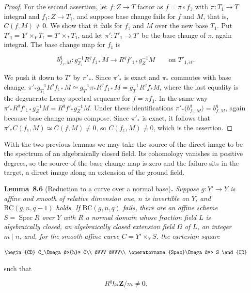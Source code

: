 \documentclass[11pt]{article}
\newenvironment{bpstatement}[2]{\par\addvspace{0.6\baselineskip}\noindent\textbf{#1}#2\textbf{.}\enspace\ignorespaces}
  {\par\addvspace{0.4\baselineskip}}
\newenvironment{bpstatementit}[2]{\begin{bpstatement}{#1}{#2}\itshape\ignorespaces}{\end{bpstatement}}
\begin{document}
\begin{proof}[{Proof}]
For the second assertion, let \(f:Z\to T\) factor as \(f=\pi\circ f_1\) with \(\pi:T_1\to T\) integral and \(f_1:Z\to T_1\), and suppose base change fails for \(f\) and \(M\), that is, \(C(f,M)\neq0\). We show that it fails for \(f_1\) and \(M\) over the new base \(T_1\). Put \(T'_1=Y'\times_YT_1=T'\times_TT_1\), and let \(\pi':T'_1\to T'\) be the base change of \(\pi\), again integral. The base change map for \(f_1\) is

\[
b^q_{f_1,M}:g_{T_1}^{-1}R^qf_{1*}M\longrightarrow R^qf'_{1*}g_Z^{-1}M
\qquad\text{on }T'_{1,\acute{e}t}.
\]

We push it down to \(T'\) by \(\pi'_*\). Since \(\pi'_*\) is exact and \(\pi_*\) commutes with base change, \(\pi'_*g_{T_1}^{-1}R^qf_{1*}M\simeq g_T^{-1}\pi_*R^qf_{1*}M
=g_T^{-1}R^qf_*M\), where the last equality is the degenerate Leray spectral sequence for \(f=\pi f_1\). In the same way \(\pi'_*R^qf'_{1*}g_Z^{-1}M=R^qf'_*g_Z^{-1}M\). Under these identifications \(\pi'_*\bigl(b^q_{f_1,M}\bigr)=b^q_{f,M}\), again because base change maps compose. Since \(\pi'_*\) is exact, it follows that \(\pi'_*C(f_1,M)\simeq C(f,M)\neq0\), so \(C(f_1,M)\neq0\), which is the assertion.
\end{proof}

\label{bp661}%
With the two previous lemmas we may take the source of the direct image to be the spectrum of an algebraically closed field. Its cohomology vanishes in positive degrees, so the source of the base change map is zero and the failure sits in the target, a direct image along an extension of the ground field.

\label{bp662}%
\begin{bpstatementit}{Lemma~8.6}{ (Reduction to a curve over a normal base)}
Suppose \(g:Y'\to Y\) is affine and smooth of relative dimension one, \(n\) is invertible on \(Y\), and \(\mathrm{BC}(g,n,q-1)\) holds. If \(\mathrm{BC}(g,n,q)\) fails, there are an affine scheme \(S=\operatorname{Spec}R\) over \(Y\) with \(R\) a normal domain whose fraction field \(L\) is algebraically closed, an algebraically closed extension field \(\Omega\) of \(L\), an integer \(m\mid n\), and, for the smooth affine curve \(C=Y'\times_YS\), the cartesian square

\[
\begin{CD}
C_\Omega @>{h}>> C\\
@VVV @VVV\\
\operatorname{Spec}\Omega @>>> S
\end{CD}
\]

such that

\[
R^qh_*\underline{\mathbf Z/m}\ne0.
\]
\end{bpstatementit}
\end{document}
